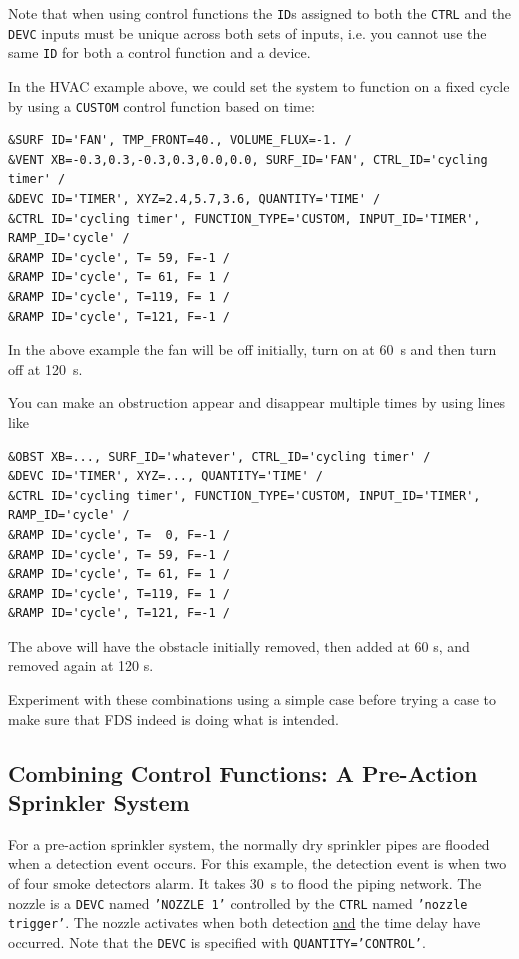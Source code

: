 \documentclass[11pt]{book}
\newcommand{\ct}{\tt\small}
\begin{document}
\begin{warning}
Note that when using control functions the {\ct ID}s assigned to both the
{\ct CTRL} and the {\ct DEVC} inputs must be unique across both sets of inputs, i.e. you cannot use the
same {\ct ID} for both a control function and a device.
\end{warning}

\noindent
In the HVAC
example above, we could set the system to function
on a fixed cycle by using a {\ct CUSTOM} control function based on time:

\footnotesize
\begin{verbatim}
&SURF ID='FAN', TMP_FRONT=40., VOLUME_FLUX=-1. /
&VENT XB=-0.3,0.3,-0.3,0.3,0.0,0.0, SURF_ID='FAN', CTRL_ID='cycling timer' /
&DEVC ID='TIMER', XYZ=2.4,5.7,3.6, QUANTITY='TIME' /
&CTRL ID='cycling timer', FUNCTION_TYPE='CUSTOM, INPUT_ID='TIMER', RAMP_ID='cycle' /
&RAMP ID='cycle', T= 59, F=-1 /
&RAMP ID='cycle', T= 61, F= 1 /
&RAMP ID='cycle', T=119, F= 1 /
&RAMP ID='cycle', T=121, F=-1 /
\end{verbatim} \normalsize

\noindent
In the above example the fan will be off initially, turn on at 60~s and then turn off at 120~s.

You can make an obstruction appear and disappear multiple times by using lines like

\footnotesize
\begin{verbatim}
&OBST XB=..., SURF_ID='whatever', CTRL_ID='cycling timer' /
&DEVC ID='TIMER', XYZ=..., QUANTITY='TIME' /
&CTRL ID='cycling timer', FUNCTION_TYPE='CUSTOM, INPUT_ID='TIMER', RAMP_ID='cycle' /
&RAMP ID='cycle', T=  0, F=-1 /
&RAMP ID='cycle', T= 59, F=-1 /
&RAMP ID='cycle', T= 61, F= 1 /
&RAMP ID='cycle', T=119, F= 1 /
&RAMP ID='cycle', T=121, F=-1 /
\end{verbatim}

\normalsize
\noindent
The above will have the obstacle initially removed, then added at 60 s, and removed again at 120 s.

Experiment with these combinations using a simple
case before trying a case to make sure that FDS indeed is doing what is intended.


\subsection{Combining Control Functions: A Pre-Action Sprinkler System}

For a pre-action sprinkler system, the normally
dry sprinkler pipes are flooded when a detection event occurs. For this example, the detection event is
when two of four smoke detectors alarm.  It takes 30~s to flood the piping network.
The nozzle is a {\ct DEVC} named {\ct 'NOZZLE 1'} controlled by the {\ct CTRL} named {\ct 'nozzle trigger'}.
The nozzle activates when both detection \underline{and} the time delay have occurred.  Note that the {\ct DEVC} is
specified with {\ct QUANTITY='CONTROL'}.
\end{document}
